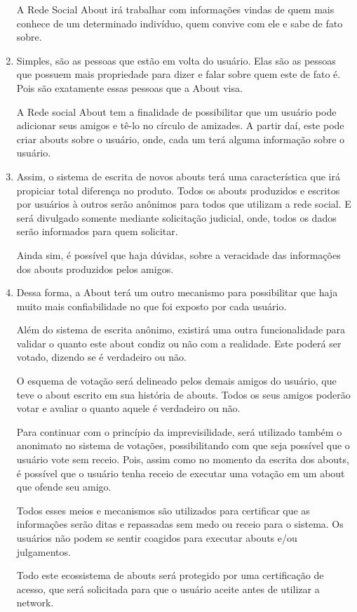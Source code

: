 \begin{enumerate}
        A Rede Social About irá trabalhar com informações vindas de quem mais conhece de um determinado
        indivíduo, quem convive com ele e sabe de fato sobre. 
    \item Simples, são as pessoas que estão em volta do usuário. Elas são as pessoas que possuem mais propriedade para dizer
e falar sobre quem este de fato é. Pois são exatamente essas pessoas que a About visa.

A Rede social About tem a finalidade de possibilitar que um usuário pode adicionar seus amigos  e tê-lo no círculo de amizades.
A partir daí, este pode criar abouts sobre o usuário, onde, cada um terá alguma informação sobre o usuário.

\item Assim, o sistema de escrita de novos abouts terá uma característica que irá propiciar total diferença
no produto. Todos os abouts produzidos e escritos por usuários à outros serão anônimos para todos
que utilizam a rede social. E será divulgado somente mediante solicitação judicial, onde, todos
os dados serão informados para quem solicitar.


Ainda sim, é possível que haja dúvidas, sobre a veracidade das informações dos abouts produzidos pelos amigos.

\item Dessa forma, a About terá um outro mecanismo para possibilitar que haja muito mais confiabilidade no que foi exposto
por cada usuário.

Além do sistema de escrita anônimo, existirá uma outra funcionalidade para validar o quanto este about condiz ou não
com a realidade. Este poderá ser votado, dizendo se é verdadeiro ou não. 

O esquema de votação será delineado pelos demais amigos do usuário, que teve o about escrito em sua história de abouts.
Todos os seus amigos poderão votar e avaliar o quanto aquele é verdadeiro ou não.

Para continuar com o princípio da imprevisilidade, será utilizado também o anonimato no sistema de votações, possibilitando
com que seja possível que o usuário vote sem receio. Pois, assim como no momento da escrita dos abouts, é possível que o 
usuário tenha receio de executar uma votação em um about que ofende seu amigo.

Todos esses meios e mecanismos são utilizados para certificar que as informações serão ditas e repassadas sem medo
ou receio para o sistema. Os usuários não podem se sentir coagidos para executar abouts e/ou julgamentos. 

Todo este ecossistema de abouts será protegido por uma certificação de acesso, que será solicitada para que o usuário
aceite antes de utilizar a network.
\end{enumerate}

